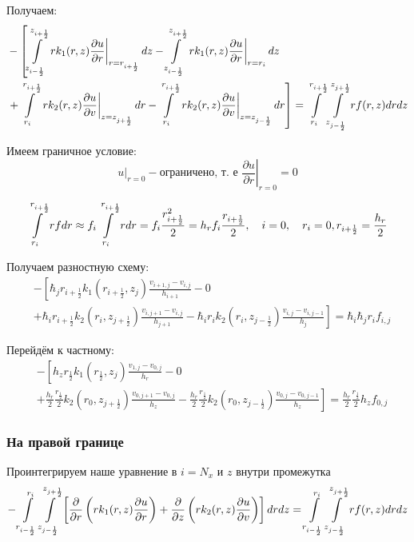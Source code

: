Получаем:
\begin{align*}
  &- \left [
   \int\limits^{z_{i+\frac{1}{2}}}_{z_{i-\frac{1}{2}}}  \left . r k_1(r, z) \pdv{u}{r} \right \vert_{r = r_{i + \frac{1}{2}}} dz
  - \int\limits^{z_{i+\frac{1}{2}}}_{z_{i-\frac{1}{2}}} \left . r k_1(r, z) \pdv{u}{r} \right \vert_{r = r_{i}} dz
  \right . \\
  &\left . + \int\limits^{r_{i+\frac{1}{2}}}_{r_{i}} \left . rk_2(r, z)\pdv{u}{v} \right \vert_{z = z_{j + \frac{1}{2}}} dr
  - \int\limits^{r_{i+\frac{1}{2}}}_{r_{i}} \left . rk_2(r, z)\pdv{u}{v} \right \vert_{z = z_{j - \frac{1}{2}}} dr
  \right ] = \int\limits^{r_{i +\frac{1}{2}}}_{r_{i }} \int\limits^{z_{j +\frac{1}{2}}}_{z_{j -\frac{1}{2}}} rf(r, z) dr dz
\end{align*}

Имеем граничное условие:
\[
  \left . u \right \vert_{r=0} - \text{ограничено, т. е } \left . \frac{\partial u}{ \partial r} \right |_{r = 0} = 0
\]

\[
  \int\limits^{r_{i+ \frac{1}{2}}}_{r_{i}} rf dr \approx f_i \int\limits^{r_{i + \frac{1}{2}}}_{r_{i}} r dr = 
  f_i \frac{r^2_{i + \frac{1}{2}}}{2} = h_r f_i \frac{r_{i + \frac{1}{2}}}{2},
  \quad i = 0, \quad r_i = 0, r_{i + \frac{1}{2}} = \frac{h_r}{2}
\]


Получаем разностную схему:
\begin{align*}
  &- \left [ 
  \hbar_j r_{i+\frac{1}{2}} k_1(r_{i+\frac{1}{2}}, z_j) \frac{v_{i+1, j} - v_{i, j}}{h_{i + 1}}
  - 0
  \right . \\
  &\left .
  + \hbar_i r_{i+\frac{1}{2}} k_2(r_i, z_{j+\frac{1}{2}}) \frac{v_{i, j + 1} - v_{i, j}}{h_{j + 1}}
  - \hbar_i r_{i} k_2(r_i, z_{j-\frac{1}{2}}) \frac{v_{i, j} - v_{i, j - 1}}{h_j}
  \right ]  = \hbar_i \hbar_j r_i f_{i, j}
\end{align*}

Перейдём к частному:
\begin{align*}
  &- \left [ 
    h_z r_{\frac{1}{2}} k_1(r_{\frac{1}{2}}, z_j) \frac{v_{1, j} - v_{0, j}}{h_{r}}
    - 0
    \right . \\
    &\left .
    + \frac{h_r}{2} \frac{r_{\frac{1}{2}}}{2} k_2(r_0, z_{j+\frac{1}{2}}) \frac{v_{0, j + 1} - v_{0, j}}{h_{z}}
    - \frac{h_r}{2} \frac{r_{\frac{1}{2}}}{2} k_2(r_0, z_{j-\frac{1}{2}}) \frac{v_{0, j} - v_{0, j - 1}}{h_z}
    \right ]  = \frac{h_r}{2} \frac{r_{\frac{1}{2}}}{2} h_z f_{0, j}
\end{align*}

\subsubsection{На правой границе}
Проинтегрируем наше уравнение в $ i = N_x $ и $ z $ внутри промежутка
\[
  - \int\limits^{r_{i }}_{r_{i -\frac{1}{2}}} \int\limits^{z_{j +\frac{1}{2}}}_{z_{j -\frac{1}{2}}} \left [ \pdv{}{r} \left ( r k_1(r, z) \pdv{u}{r} \right ) 
  + \pdv{}{z} \left ( rk_2(r, z)\pdv{u}{v} \right ) \right ]dr dz = \int\limits^{r_{i }}_{r_{i -\frac{1}{2}}} \int\limits^{z_{j +\frac{1}{2}}}_{z_{j -\frac{1}{2}}} rf(r, z)dr dz
\]

